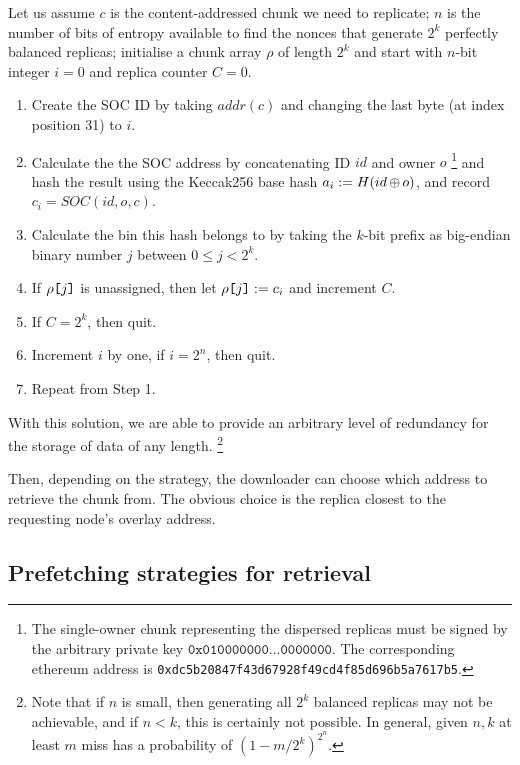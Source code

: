 Let us assume $c$ is the content-addressed chunk we need to replicate; $n$ is the number of bits of entropy available to find the nonces that generate  $2^k$  perfectly balanced replicas; initialise a chunk array $\rho$ of length $2^k$ and start with $n$-bit integer $i=0$ and replica counter $C=0$.

\begin{enumerate}[noitemsep]
  \item Create the SOC ID by taking $\mathit{addr}(c)$ and changing the last byte (at index position 31) to  $i$.
  \item Calculate the the SOC address by concatenating ID $id$ and owner $o$%
%
\footnote{The single-owner chunk representing the dispersed replicas must be signed by the arbitrary private key $\texttt{0x010000000...0000000}$. The corresponding ethereum address is 
\texttt{0xdc5b20847f43d67928f49cd4f85d696b5a7617b5}.}
%
and hash the result using the Keccak256 base hash $a_i:=H(id\operatorname{\operatorname{\oplus}} o)$, and record $c_i=\mathit{SOC}(id,o,c)$.
  \item Calculate the bin this hash belongs to by taking the $k$-bit prefix as big-endian binary number $j$ between $0\leq j<2^k$.
  \item If $\rho\texttt{[}\/j\/\texttt{]}$ is unassigned, then let $\rho\texttt{[}\/j\/\texttt{]}:=c_i$ and increment $C$.
  \item If $C=2^k$, then quit.
  \item Increment $i$ by one, if $i=2^n$, then quit.
  \item Repeat from Step 1.
\end{enumerate}

With this solution, we are able to provide an arbitrary level of redundancy for the storage of data of any length.
%
%
\footnote{Note that if $n$ is small, then generating all $2^k$ balanced replicas may not be achievable, and if $n<k$, this is certainly not possible.
In general, given $n, k$ at least $m$ miss has a probability of $(1 - m/2^k)^{2^n}$.}

Then, depending on the strategy, the downloader can choose which  address to retrieve the chunk from. The obvious choice is the replica closest to the requesting node's overlay address.


\subsection{Prefetching strategies for retrieval}
\label{sec:strategies}


